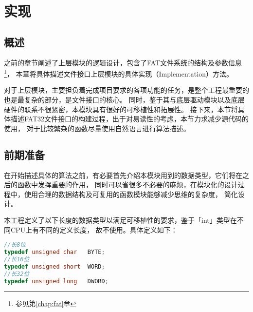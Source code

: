 
\chapter{实现}
\label{chap:Implementation}


\section{概述}
\label{sec:implementcomment}
之前的章节阐述了上层模块的逻辑设计，包含了FAT文件系统的结构及参数信息\footnote{参见第\ref{chap:fat}章}，
本章将具体描述文件接口上层模块的具体实现（Implementation）方法。

对于上层模块，主要担负着完成项目要求的各项功能的任务，是整个工程最重要的也是最复杂的部分，是文件接口的核心。
同时，鉴于其与底层驱动模块以及底层硬件的联系不很紧密，本模块具有很好的可移植性和拓展性。
接下来，本节将具体描述FAT32文件接口的构建过程，出于对易读性的考虑，本节力求减少源代码的使用，
对于比较繁杂的函数尽量使用自然语言进行算法描述。
\section{前期准备}
\label{sec:prepare}
在开始描述具体的算法之前，有必要首先介绍本模块用到的数据类型，它们将在之后的函数中发挥重要的作用，
同时可以省很多不必要的麻烦，在模块化的设计过程中，使用合理的数据结构及可复用的函数模块能够减少思维的复杂度，
简化设计。

本工程定义了以下长度的数据类型以满足可移植性的要求，鉴于「int」类型在不同CPU上有不同的定义长度，
故不使用。具体定义如下：
\begin{lstlisting}[language={C}, caption={数据类型重定义}]
//长8位
typedef unsigned char	BYTE;
//长16位
typedef unsigned short	WORD;
//长32位
typedef unsigned long	DWORD;
\end{lstlisting}

